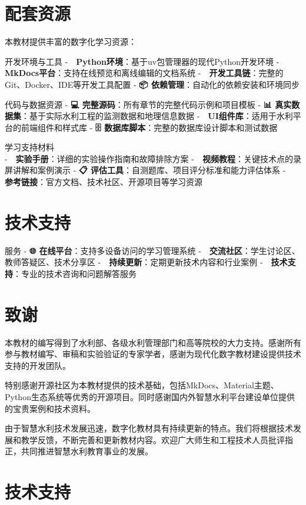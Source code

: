 \section{配套资源}

本教材提供丰富的数字化学习资源：

 开发环境与工具 - \textbf{🐍 Python环境}：基于uv包管理器的现代Python开发环境 - \textbf{📝 MkDocs平台}：支持在线预览和离线编辑的文档系统 - \textbf{🔧 开发工具链}：完整的Git、Docker、IDE等开发工具配置 - \textbf{📦 依赖管理}：自动化的依赖安装和环境同步

 代码与数据资源 - \textbf{💻 完整源码}：所有章节的完整代码示例和项目模板 - \textbf{📊 真实数据集}：基于实际水利工程的监测数据和地理信息数据 - \textbf{🎨 UI组件库}：适用于水利平台的前端组件和样式库 - \textbf{🗄️ 数据库脚本}：完整的数据库设计脚本和测试数据

 学习支持材料\\
- \textbf{📖 实验手册}：详细的实验操作指南和故障排除方案 - \textbf{🎥 视频教程}：关键技术点的录屏讲解和案例演示 - \textbf{📋 评估工具}：自测题库、项目评分标准和能力评估体系 - \textbf{🔗 参考链接}：官方文档、技术社区、开源项目等学习资源


\section{技术支持}

服务 - \textbf{🌐 在线平台}：支持多设备访问的学习管理系统 - \textbf{💬 交流社区}：学生讨论区、教师答疑区、技术分享区 - \textbf{🚀 持续更新}：定期更新技术内容和行业案例 - \textbf{📧 技术支持}：专业的技术咨询和问题解答服务

\section{致谢}

本教材的编写得到了水利部、各级水利管理部门和高等院校的大力支持。感谢所有参与教材编写、审稿和实验验证的专家学者，感谢为现代化数字教材建设提供技术支持的开发团队。

特别感谢开源社区为本教材提供的技术基础，包括MkDocs、Material主题、Python生态系统等优秀的开源项目。同时感谢国内外智慧水利平台建设单位提供的宝贵案例和技术资料。

由于智慧水利技术发展迅速，数字化教材具有持续更新的特点。我们将根据技术发展和教学反馈，不断完善和更新教材内容。欢迎广大师生和工程技术人员批评指正，共同推进智慧水利教育事业的发展。

\section{技术支持}

